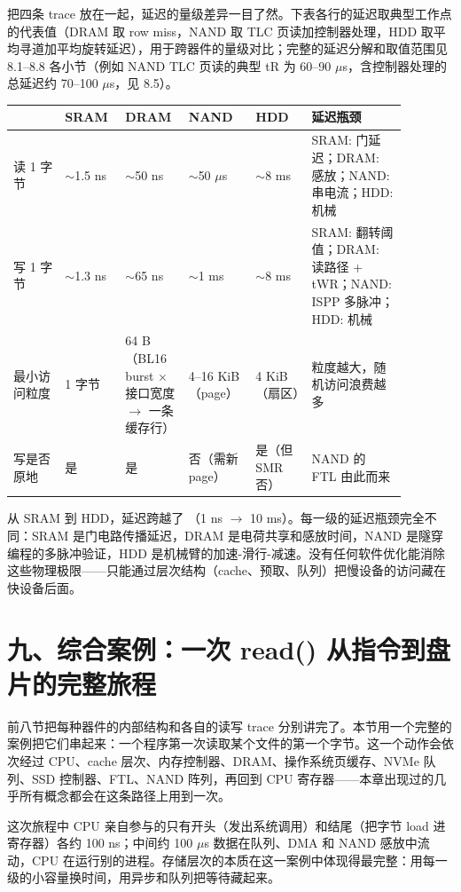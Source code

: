 
把四条 trace 放在一起，延迟的量级差异一目了然。下表各行的延迟取典型工作点的代表值（DRAM 取 row miss，NAND 取 TLC 页读加控制器处理，HDD 取平均寻道加平均旋转延迟），用于跨器件的量级对比；完整的延迟分解和取值范围见 8.1--8.8 各小节（例如 NAND TLC 页读的典型 tR 为 60--90 $\mu$s，含控制器处理的总延迟约 70--100 $\mu$s，见 8.5）。

\begin{longtable}{L{0.12\linewidth}L{0.135\linewidth}L{0.135\linewidth}L{0.135\linewidth}L{0.135\linewidth}L{0.22\linewidth}}
\toprule
& SRAM & DRAM & NAND & HDD & 延迟瓶颈 \\
\midrule
读 1 字节 & $\sim$1.5 ns & $\sim$50 ns & $\sim$50 $\mu$s & $\sim$8 ms & SRAM: 门延迟；DRAM: 感放；NAND: 串电流；HDD: 机械 \\
写 1 字节 & $\sim$1.3 ns & $\sim$65 ns & $\sim$1 ms & $\sim$8 ms & SRAM: 翻转阈值；DRAM: 读路径 + tWR；NAND: ISPP 多脉冲；HDD: 机械 \\
最小访问粒度 & 1 字节 & 64 B（BL16 burst $\times$ 接口宽度 $\to$ 一条缓存行） & 4--16 KiB（page） & 4 KiB（扇区） & 粒度越大，随机访问浪费越多 \\
写是否原地 & 是 & 是 & 否（需新 page） & 是（但 SMR 否） & NAND 的 FTL 由此而来 \\
\bottomrule
\end{longtable}

从 SRAM 到 HDD，延迟跨越了 （1 ns $\to$ 10 ms）。每一级的延迟瓶颈完全不同：SRAM 是门电路传播延迟，DRAM 是电荷共享和感放时间，NAND 是隧穿编程的多脉冲验证，HDD 是机械臂的加速-滑行-减速。没有任何软件优化能消除这些物理极限——只能通过层次结构（cache、预取、队列）把慢设备的访问藏在快设备后面。

\section{九、综合案例：一次 read() 从指令到盘片的完整旅程}

前八节把每种器件的内部结构和各自的读写 trace 分别讲完了。本节用一个完整的案例把它们串起来：一个程序第一次读取某个文件的第一个字节。这一个动作会依次经过 CPU、cache 层次、内存控制器、DRAM、操作系统页缓存、NVMe 队列、SSD 控制器、FTL、NAND 阵列，再回到 CPU 寄存器——本章出现过的几乎所有概念都会在这条路径上用到一次。

\begin{keyidea}
这次旅程中 CPU 亲自参与的只有开头（发出系统调用）和结尾（把字节 load 进寄存器）各约 100 ns；中间约 100 $\mu$s 数据在队列、DMA 和 NAND 感放中流动，CPU 在运行别的进程。存储层次的本质在这一案例中体现得最完整：用每一级的小容量换时间，用异步和队列把等待藏起来。
\end{keyidea}

